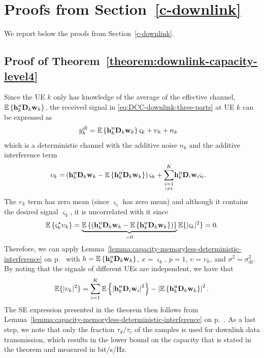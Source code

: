 \documentclass[SIG,biber]{nowfnt}
\newcommand{\vect}[1]{\mathbf{#1}}
\newcommand{\condSum}[3]{\overset{#3}{\underset{\underset{#2}{#1}}{\sum}}}
\def\Htran{\mbox{\tiny $\mathrm{H}$}}
\def\sigmaDL{\sigma^2_{\mathrm{dl}}}
\begin{document}
	
	\section{Proofs from Section~\ref{c-downlink}}
	We report below the proofs from Section~\ref{c-downlink}.
\subsection{Proof of Theorem~\ref{theorem:downlink-capacity-level4}}\label{proof-of-theorem:downlink-capacity-level4}

Since the UE $k$ only has knowledge of the average of the effective channel, $\mathbb{E}\left\{\vect{h}_{k}^{\Htran}\vect{D}_{k}\vect{w}_k\right\}$, the received signal in \eqref{eq:DCC-downlink-three-parts} at UE $k$ can be expressed as
	\begin{align} \label{eq:UE-decoding-level4}
	y_k^{\rm{dl}} &= \mathbb{E}\left\{\vect{h}_{k}^{\Htran}\vect{D}_{k}\vect{w}_k\right\} \varsigma_k + \upsilon_k +  n_k 
	\end{align}
	which is a deterministic channel with the additive noise $n_k$ and the additive interference term
	\begin{align}  \upsilon_k 
	= & \left(\vect{h}_{k}^{\Htran}\vect{D}_{k}\vect{w}_k-\mathbb{E}\left\{\vect{h}_{k}^{\Htran}\vect{D}_{k}\vect{w}_k\right\} \right) \varsigma_k + 
	\condSum{i=1}{i \neq k}{K} \vect{h}_{k}^{\Htran}\vect{D}_{i}\vect{w}_i \varsigma_i.
	\end{align}
	The $\upsilon_k$ term has zero mean (since $\varsigma_i$ has zero mean) and although it contains the desired signal $\varsigma_k$, it is uncorrelated with it since
\begin{equation}
\mathbb{E}\left\{ \varsigma_k^{\star} \upsilon_k \right\} = 
\underbrace{\mathbb{E} \left\{ \left(\vect{h}_{k}^{\Htran}\vect{D}_{k}\vect{w}_k-\mathbb{E}\left\{\vect{h}_{k}^{\Htran}\vect{D}_{k}\vect{w}_k\right\} \right)  \right\}}_{=0} \mathbb{E}\{ | \varsigma_k|^2\} = 0.
\end{equation}
Therefore, we can apply Lemma~\ref{lemma:capacity-memoryless-deterministic-interference} on p.~\pageref{lemma:capacity-memoryless-deterministic-interference} with $h =\mathbb{E}\left\{\vect{h}_{k}^{\Htran}\vect{D}_{k}\vect{w}_k\right\} $, $x= \varsigma_k$, $p=1$, $\upsilon = \upsilon_k$, and $\sigma^2=\sigmaDL$.
By noting that the signals of different UEs are independent, we have that
\begin{equation}
\mathbb{E} \{ |\upsilon_k |^2 \} = \sum\limits_{i=1}^{K} \mathbb{E} \left\{ \left|  \vect{h}_{k}^{\Htran} \vect{D}_{i} \vect{w}_{i} \right|^2 \right\} -  \left| \mathbb{E} \left\{  \vect{h}_{k}^{\Htran} \vect{D}_{k} \vect{w}_{k} \right\} \right|^2.
\end{equation}
The SE expression presented in the theorem then follows from Lemma~\ref{lemma:capacity-memoryless-deterministic-interference} on p.~\pageref{lemma:capacity-memoryless-deterministic-interference}.  
 As a last step, we note that only the fraction $\tau_d/\tau_c$ of the samples is used for downlink data transmission, which results in the lower bound on the capacity that is stated in the theorem and measured in bit/s/Hz.
\end{document}
